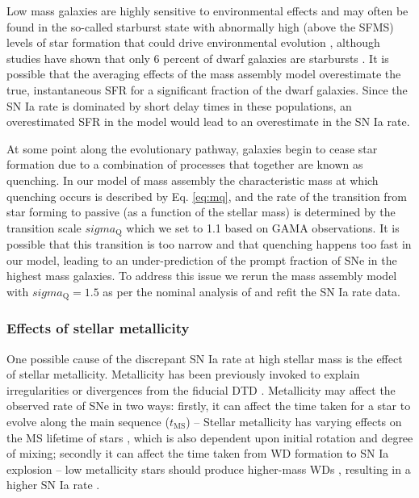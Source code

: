 \documentclass[fleqn,usenatbib]{mnras}
\begin{document}
Low mass galaxies are highly sensitive to environmental effects and may often be found in the so-called starburst state with abnormally high (above the SFMS) levels of star formation that could drive environmental evolution \citep[e.g.][]{Dekel1986,Marlowe1995,Tremonti2004,Lee2006}, although studies have shown that only 6 percent of dwarf galaxies are starbursts \citep{Lee2009}. It is possible that the averaging effects of the mass assembly model overestimate the true, instantaneous SFR for a significant fraction of the dwarf galaxies. Since the SN Ia rate is dominated by short delay times in these populations, an overestimated SFR in the model would lead to an overestimate in the SN Ia rate.

At some point along the evolutionary pathway, galaxies begin to cease star formation due to a combination of processes that together are known as quenching. In our model of mass assembly the characteristic mass at which quenching occurs is described by Eq. \ref{eq:mq}, and the rate of the transition from star forming to passive (as a function of the stellar mass) is determined by the transition scale $sigma_{\mathrm{Q}}$ which we set to 1.1 based on GAMA observations. It is possible that this transition is too narrow and that quenching happens too fast in our model, leading to an under-prediction of the prompt fraction of SNe in the highest mass galaxies. To address this issue we rerun the mass assembly model with $sigma_{\mathrm{Q}} = 1.5$ as per the nominal analysis of \citet{Childress2014} and refit the SN Ia rate data.

\subsubsection{Effects of stellar metallicity}

One possible cause of the discrepant SN Ia rate at high stellar mass is the effect of stellar metallicity. Metallicity has been previously invoked to explain irregularities or divergences from the fiducial DTD \citep[e.g.][]{Strolger2010,Meng2011,Kistler2013}. Metallicity may affect the observed rate of SNe in two ways: firstly, it can affect the time taken for a star to evolve along the main sequence ($t_{\mathrm{MS}}$) -- Stellar metallicity has varying effects on the MS lifetime of stars \citep[e.g.][]{Georgy2013,Amard2020}, which is also dependent upon initial rotation and degree of mixing; secondly it can affect the time taken from WD formation to SN Ia explosion -- low metallicity stars should produce higher-mass WDs \citep[e.g.][]{Umeda1999,Marigo2007}, resulting in a higher SN Ia rate \citep{Kistler2013}. 
\end{document}
